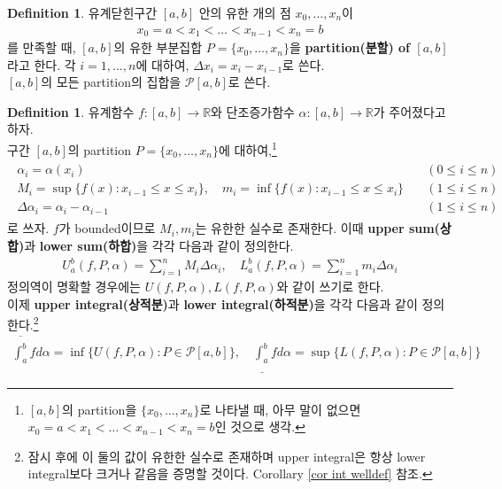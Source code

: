 \documentclass[12pt]{article}
\theoremstyle{definition}
\newtheorem{defn}[thm]{Definition}
\def\RR{\mathbb{R}}
\begin{document}
\begin{defn}
	유계닫힌구간 \([a, b]\) 안의 유한 개의 점 \(x_0, \ldots, x_n\)이
	\begin{gather*}
		x_0 = a < x_1 < \ldots < x_{n-1} < x_n = b
	\end{gather*}
	를 만족할 때, \([a, b]\)의 유한 부분집합 \(P = \{x_0, \ldots, x_n\}\)을 \textbf{partition(분할) of \([a, b]\)}라고 한다. 각 \(i = 1, \ldots, n\)에 대하여, \(\Delta x_i = x_i - x_{i-1}\)로 쓴다.\\
	\([a, b]\)의 모든 partition의 집합을 \(\mathcal{P}[a, b]\)로 쓴다.
\end{defn}

\begin{defn} \label{def stieltjes}
	유계함수 \(f: [a, b] \rightarrow \RR\)와 단조증가함수 \(\alpha: [a, b] \rightarrow \RR\)가 주어졌다고 하자.\\
	구간 \([a, b]\)의 partition \(P = \{x_0, \ldots, x_n\}\)에 대하여,\footnote{\([a, b]\)의 partition을 \(\{x_0, \ldots, x_n\}\)로 나타낼 때, 아무 말이 없으면 \(x_0 = a < x_1 < \ldots < x_{n-1} < x_n = b\)인 것으로 생각.} 
	\begin{align} \label{eq def Mi}
		\begin{split}
			\alpha_i = \alpha(x_i) \quad &(0 \le i \le n)\\
			M_i = \sup \{f(x): x_{i-1} \le x \le x_i\}, \quad m_i = \inf \{f(x): x_{i-1} \le x \le x_i\} \quad &(1 \le i \le n)\\
			\Delta\alpha_i = \alpha_i - \alpha_{i-1} \quad &(1 \le i \le n)
		\end{split}		
	\end{align}
	로 쓰자. \(f\)가 bounded이므로 \(M_i, m_i\)는 유한한 실수로 존재한다. 이때 \textbf{upper sum(상합)}과 \textbf{lower sum(하합)}을 각각 다음과 같이 정의한다.
	\begin{gather*}
		U_a^b (f, P, \alpha) = \sum_{i=1}^n M_i \Delta\alpha_i, \quad 	L_a^b (f, P, \alpha) = \sum_{i=1}^n m_i \Delta\alpha_i
	\end{gather*}
	정의역이 명확할 경우에는 \(U(f, P, \alpha), L(f, P, \alpha)\)와 같이 쓰기로 한다.\\
	이제 \textbf{upper integral(상적분)}과 \textbf{lower integral(하적분)}을 각각 다음과 같이 정의한다.\footnote{잠시 후에 이 둘의 값이 유한한 실수로 존재하며 upper integral은 항상 lower integral보다 크거나 같음을 증명할 것이다. Corollary \ref{cor int welldef} 참조.}
	\begin{gather*}
		\overline{\int_a^b} f d\alpha = \inf \{U(f, P, \alpha): P \in \mathcal{P}[a, b]\}, \quad \underline{\int_a^b} f d\alpha = \sup \{L(f, P, \alpha): P \in \mathcal{P}[a, b]\}

\end{gather*}
\end{defn}
\end{document}
